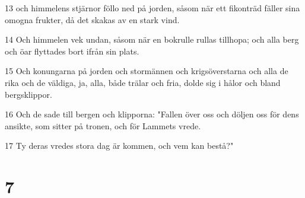 \par 13 och himmelens stjärnor föllo ned på jorden, såsom när ett fikonträd fäller sina omogna frukter, då det skakas av en stark vind.
\par 14 Och himmelen vek undan, såsom när en bokrulle rullas tillhopa; och alla berg och öar flyttades bort ifrån sin plats.
\par 15 Och konungarna på jorden och stormännen och krigsöverstarna och alla de rika och de väldiga, ja, alla, både trälar och fria, dolde sig i hålor och bland bergsklippor.
\par 16 Och de sade till bergen och klipporna: "Fallen över oss och döljen oss för dens ansikte, som sitter på tronen, och för Lammets vrede.
\par 17 Ty deras vredes stora dag är kommen, och vem kan bestå?"

\chapter{7}

